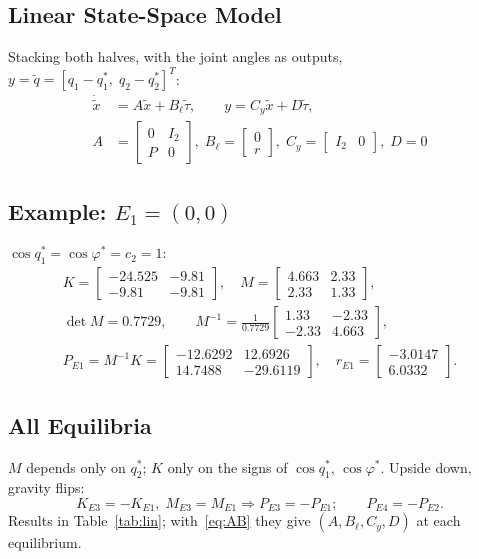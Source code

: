 \documentclass[10pt,twocolumn,letterpaper]{article}
\begin{document}
\subsection{Linear State-Space Model}
Stacking both halves, with the joint angles as outputs, $y=\tilde q=[q_1-q_1^*,\;q_2-q_2^*]^T$:
\begin{equation}
\boxed{\begin{aligned}
\dot{\tilde x}&=A\tilde x+B_\ell\tilde\tau,\qquad y=C_y\tilde x+D\tilde\tau,\\
A&=\begin{bmatrix}0 & I_2\\ P & 0\end{bmatrix}\!,\;
B_\ell=\begin{bmatrix}0\\ r\end{bmatrix}\!,\;
C_y=\begin{bmatrix}I_2 & 0\end{bmatrix}\!,\; D=0
\end{aligned}}\label{eq:AB}
\end{equation}

\subsection{Example: $E_1=(0,0)$}
$\cos q_1^*=\cos\varphi^*=c_2=1$:
\begin{gather*}
K=\begin{bmatrix}-24.525&-9.81\\-9.81&-9.81\end{bmatrix}\!,\quad
M=\begin{bmatrix}4.663&2.33\\2.33&1.33\end{bmatrix}\!,\\
\det M=0.7729,\qquad M^{-1}=\frac{1}{0.7729}\begin{bmatrix}1.33&-2.33\\-2.33&4.663\end{bmatrix}\!,\\
P_{E1}=M^{-1}K=\begin{bmatrix}-12.6292&12.6926\\14.7488&-29.6119\end{bmatrix}\!,\quad
r_{E1}=\begin{bmatrix}-3.0147\\6.0332\end{bmatrix}\!.
\end{gather*}

\subsection{All Equilibria}
$M$ depends only on $q_2^*$; $K$ only on the signs of $\cos q_1^*$, $\cos\varphi^*$. Upside down, gravity flips:
\begin{equation*}
K_{E3}=-K_{E1},\;M_{E3}=M_{E1}\Rightarrow P_{E3}=-P_{E1};\qquad P_{E4}=-P_{E2}.
\end{equation*}
Results in Table~\ref{tab:lin}; with~\eqref{eq:AB} they give $(A,B_\ell,C_y,D)$ at each equilibrium.
\end{document}
